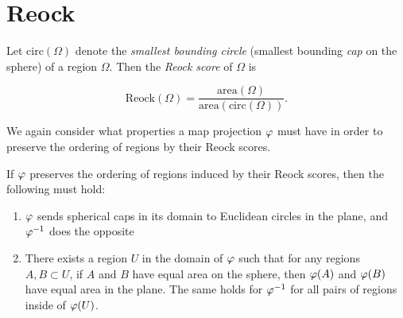 \section{Reock}\label{sec:reock}

Let $\mathrm{circ}(\Omega)$ denote the \textit{smallest bounding
circle} (smallest bounding \textit{cap} on the sphere) of a region
$\Omega$.  Then the \textit{Reock score} of $\Omega$ is 

$$\mathrm{Reock}(\Omega)=
\frac{\mathrm{area}(\Omega)}{\mathrm{area}(\mathrm{circ}(\Omega))}.$$

We again consider what properties a map projection $\varphi$ must have in order to preserve the ordering of regions by their Reock scores.  

\begin{lemma}\label{lem:reock_prep}
  If $\varphi$ preserves the ordering of regions induced by their Reock scores, then the following must hold:
  \begin{enumerate}
    \item $\varphi$ sends spherical caps in its domain to Euclidean circles in the plane,  and $\varphi^{-1}$ does the opposite 
    \item There exists a region $U$ in the domain of $\varphi$ such that for any regions $A,B\subset U$, if $A$ and $B$ have equal area on the sphere, then $\varphi(A)$ and $\varphi(B)$ have equal area in the plane.  The same holds for $\varphi^{-1}$ for all pairs of regions inside of $\varphi(U)$.
  \end{enumerate}
\end{lemma}
